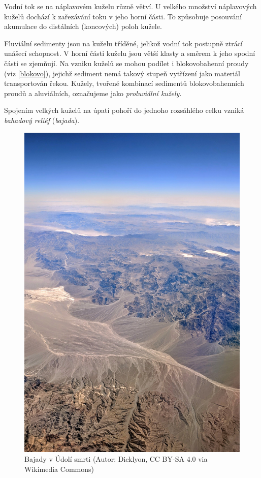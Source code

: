 Vodní tok se na náplavovém kuželu různě větví. U velkého množství náplavových kuželů dochází k zařezávání toku v jeho horní části. To způsobuje posouvání akumulace do distálních (koncových) poloh kužele. 

Fluviální sedimenty jsou na kuželu tříděné, jelikož vodní tok postupně ztrácí unášecí schopnost. V horní části kuželu jsou větší klasty a směrem k jeho spodní části se zjemňují. Na vzniku kuželů se mohou podílet i blokovobahenní proudy (viz \ref{blokovo}), jejichž sediment nemá takový stupeň vytřízení jako materiál transportován řekou. Kužely, tvořené kombinací sedimentů blokovobahenních proudů a aluviálních, označujeme jako \emph{proluviální kužely}.

Spojením velkých kuželů na úpatí pohoří do jednoho rozsáhlého celku vzniká \emph{bahadový reliéf} (\textit{bajada}). 

\begin{figure}[h]
	\centering
	\includegraphics[width=1\linewidth]{obrazky/fluvial/bajada}
	\caption{Bajady v Údolí smrti (Autor: Dicklyon, CC BY-SA 4.0 via Wikimedia Commons)}
	\label{fig:bajada}
\end{figure}

